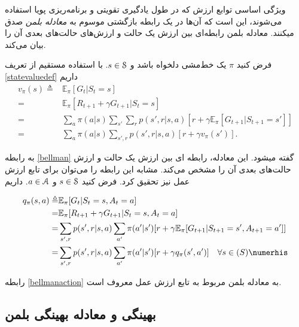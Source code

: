 ویژگی اساسی توابع ارزش که در طول یادگیری تقویتی و برنامه‌ریزی پویا استفاده می‌شوند،  این است که آن‌ها در یک رابطه بازگشتی موسوم به 
\textit{معادله بلمن} 
صدق می\nf کنند. معادله بلمن رابطه‌ای بین ارزش یک حالت و ارزش‌های حالت‌های بعدی آن را بیان می‌کند.

فرض کنید $\pi$ یک خط‌مشی دلخواه باشد و
 $s \in \EuScript{S}$.
  با استفاده مستقیم از تعریف
 \ref{statevaluedef}
 داریم
\begin{align}
v_\pi (s) \triangleq& \mathbb{E}_\pi [G_t | S_t = s] \nonumber \\
=& \mathbb{E}_\pi [R_{t+1}+ \gamma G_{t+1}|S_t=s] \nonumber \\
=&\sum_{a} \pi(a|s) \sum_{s'}\sum_{r} p(s',r|s,a)[r+\gamma \mathbb{E}_\pi[G_{t+1}|S_{t+1}=s']] \nonumber\\
=&\sum_{a} \pi(a|s) \sum_{s',r} p(s',r|s,a)[r+\gamma v_\pi(s')] %
\label{bellman}.
\end{align}

به رابطه 
 \ref{bellman}
 گفته می\nf شود. این معادله، رابطه ای بین ارزش یک حالت و ارزش حالت‌های بعدی آن را مشخص می‌کند. مشابه این رابطه را می‌توان برای تابع ارزش عمل نیز تحقیق کرد. فرض کنید 
$s \in \EuScript{S}$
 و 
 $a \in \EuScript{A}$.
 داریم
 
\begin{align}
q_\pi (s,a) \triangleq& \mathbb{E}_\pi [G_t | S_t = s, A_t = a] \nonumber \\
=& \mathbb{E}_\pi [R_{t+1}+ \gamma G_{t+1}|S_t=s, A_t = a] \nonumber \\
=&\sum_{s',r} p(s',r|s,a) \sum_{a'} \pi(a'|s')[r+\gamma \mathbb{E}_\pi[G_{t+1}|S_{t+1}=s', A_{t+1} = a']] \nonumber\\
=&\sum_{s',r}  p(s',r|s,a) \sum_{a'} \pi(a'|s')[r+\gamma q_\pi(s',a')] \quad \forall s \in \mathbb(S) \numerhis 
\label{bellmanaction}
\end{align}

رابطه \ref{bellmanaction} به معادله بلمن مربوط به تابع ارزش عمل معروف است.
\subsection{بهینگی و معادله بهینگی بلمن}

